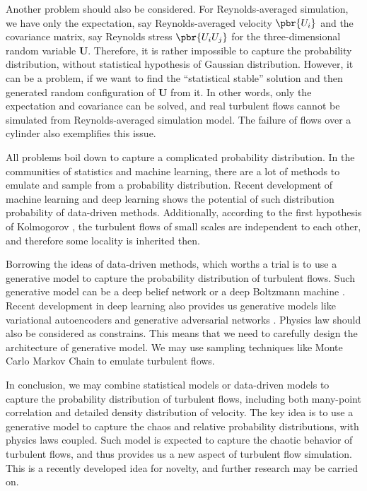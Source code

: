 \documentclass[english, nochinese]{pkupaper}
\begin{document}
Another problem should also be considered. For Reynolds-averaged simulation, we have only the expectation, say Reynolds-averaged velocity $\pbr{U_i}$ and the covariance matrix, say Reynolds stress $ \pbr{ U_i U_j } $ for the three-dimensional random variable $\mathbf{U}$. Therefore, it is rather impossible to capture the probability distribution, without statistical hypothesis of Gaussian distribution. However, it can be a problem, if we want to find the ``statistical stable'' solution and then generated random configuration of $\mathbf{U}$ from it. In other words, only the expectation and covariance can be solved, and real turbulent flows cannot be simulated from Reynolds-averaged simulation model. The failure of flows over a cylinder also exemplifies this issue.

All problems boil down to capture a complicated probability distribution. In the communities of statistics and machine learning, there are a lot of methods to emulate and sample from a probability distribution. Recent development of machine learning and deep learning shows the potential of such distribution probability of data-driven methods. Additionally, according to the first hypothesis of Kolmogorov \parencite{kolmogorov_equations_1941}, the turbulent flows of small scales are independent to each other, and therefore some locality is inherited then.

Borrowing the ideas of data-driven methods, which worths a trial is to use a generative model to capture the probability distribution of turbulent flows. Such generative model can be a deep belief network \parencite{hinton_fast_2006} \parencite{lee_convolutional_2009} or a deep Boltzmann machine \parencite{salakhutdinov_restricted_2007} \parencite{nair_rectified_2010} \parencite{salakhutdinov_efficient_2010}. Recent development in deep learning also provides us generative models like variational autoencoders \parencite{kingma_auto-encoding_2013} \parencite{doersch_tutorial_2016} and generative adversarial networks \parencite{goodfellow_nips_2016} \parencite{arjovsky_wasserstein_2017}. Physics law should also be considered as constrains. This means that we need to carefully design the architecture of generative model. We may use sampling techniques like Monte Carlo Markov Chain to emulate turbulent flows.

In conclusion, we may combine statistical models or data-driven models to capture the probability distribution of turbulent flows, including both many-point correlation and detailed density distribution of velocity. The key idea is to use a generative model to capture the chaos and relative probability distributions, with physics laws coupled. Such model is expected to capture the chaotic behavior of turbulent flows, and thus provides us a new aspect of turbulent flow simulation. This is a recently developed idea for novelty, and further research may be carried on.
\end{document}
